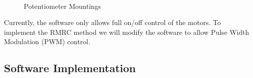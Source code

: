 \documentclass[paper=letter, fontsize=10pt]{scrartcl}	%
\numberwithin{equation}{section}															%
\numberwithin{figure}{section}																%
\numberwithin{table}{section}																%
\begin{document}
\begin{figure}
\centering

\quad
{}\quad
{}\\
\quad
{}
\caption{Potentiometer Mountings}
\label{fig:PotMounting}
\end{figure}


Currently, the software only allows full on/off control of the motors. To implement the RMRC method we will modify the software to allow Pulse Width Modulation (PWM) control.

\subsection{Software Implementation}
\end{document}

